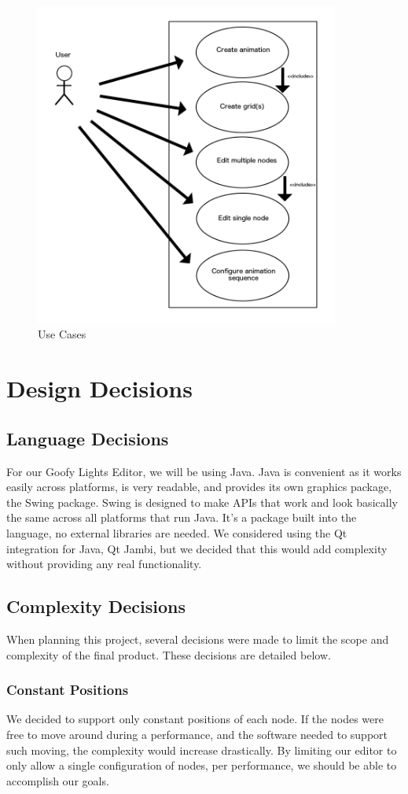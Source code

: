 \documentclass[12pt]{article}
\begin{document}
	\begin{figure}[ht!]
		\centering
		\includegraphics[width=100mm]{Relationship_Use.png}
		\caption{Use Cases}
	\end{figure}
	\clearpage
	
\newpage

	\section{Design Decisions}
	\subsection{Language Decisions}
	For our Goofy Lights Editor, we will be using Java. Java is convenient as it works easily across platforms, is very readable, and provides its own graphics package, the Swing package. Swing is designed to make APIs that work and look basically the same across all platforms that run Java. It's a package built into the language, no external libraries are needed. We considered using the Qt integration for Java, Qt Jambi, but we decided that this would add complexity without providing any real functionality. 
	
	\subsection{Complexity Decisions}
	When planning this project, several decisions were made to limit the scope and complexity of the final product. These decisions are detailed below. 
	\subsubsection{Constant Positions}
	We decided to support only constant positions of each node. If the nodes were free to move around during a performance, and the software needed to support such moving, the complexity would increase drastically. By limiting our editor to only allow a single configuration of nodes, per performance, we should be able to accomplish our goals. 
\end{document}
